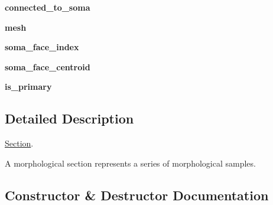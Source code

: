 \begin{DoxyCompactItemize}
\item 
{\bfseries connected\+\_\+to\+\_\+soma}\hypertarget{classmeshy_1_1neuromorphovis_1_1skeleton_1_1structure_1_1section_1_1Section_a69e41c6631182e7085c793ffc5964fda}{}\label{classmeshy_1_1neuromorphovis_1_1skeleton_1_1structure_1_1section_1_1Section_a69e41c6631182e7085c793ffc5964fda}

\item 
{\bfseries mesh}\hypertarget{classmeshy_1_1neuromorphovis_1_1skeleton_1_1structure_1_1section_1_1Section_a448c3a0a47e1c1260e3dd13c583b6d1e}{}\label{classmeshy_1_1neuromorphovis_1_1skeleton_1_1structure_1_1section_1_1Section_a448c3a0a47e1c1260e3dd13c583b6d1e}

\item 
{\bfseries soma\+\_\+face\+\_\+index}\hypertarget{classmeshy_1_1neuromorphovis_1_1skeleton_1_1structure_1_1section_1_1Section_ab4cad6b6c56303523f86e858a577bf27}{}\label{classmeshy_1_1neuromorphovis_1_1skeleton_1_1structure_1_1section_1_1Section_ab4cad6b6c56303523f86e858a577bf27}

\item 
{\bfseries soma\+\_\+face\+\_\+centroid}\hypertarget{classmeshy_1_1neuromorphovis_1_1skeleton_1_1structure_1_1section_1_1Section_a417b6098d7c5b2faddd6b11bd2fcf23a}{}\label{classmeshy_1_1neuromorphovis_1_1skeleton_1_1structure_1_1section_1_1Section_a417b6098d7c5b2faddd6b11bd2fcf23a}

\item 
{\bfseries is\+\_\+primary}\hypertarget{classmeshy_1_1neuromorphovis_1_1skeleton_1_1structure_1_1section_1_1Section_a79a9b50d29aa82508be329e099fa932d}{}\label{classmeshy_1_1neuromorphovis_1_1skeleton_1_1structure_1_1section_1_1Section_a79a9b50d29aa82508be329e099fa932d}

\end{DoxyCompactItemize}


\subsection{Detailed Description}
\hyperlink{classmeshy_1_1neuromorphovis_1_1skeleton_1_1structure_1_1section_1_1Section}{Section}. 

\begin{DoxyVerb}A morphological section represents a series of morphological samples. \end{DoxyVerb}
 

\subsection{Constructor \& Destructor Documentation}
